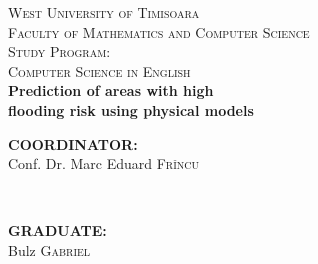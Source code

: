 \documentclass[12pt, a4paper]{report}
\begin{document}
\begin{titlepage}

\newcommand{\HRule}{\rule{\linewidth}{0.5mm}} %

\center %


\vspace{3cm}


\textsc{\LARGE West University of  Timisoara}\\[0.5cm] %
\textsc{\Large Faculty of Mathematics and Computer Science}\\[0.5cm] %
\textsc{\large Study Program: \\Computer Science in English}\\[6cm] %




{\Huge \bfseries Prediction of areas with high  }
\\[0.4cm]
{\Huge \bf flooding risk using physical models}\\[5cm] %
 


\begin{minipage}{0.4\textwidth}
\begin{flushleft} \large
\textbf{COORDINATOR:}\\
Conf. Dr. Marc Eduard \textsc{Fr\^incu} %
\end{flushleft}
\end{minipage}
~
\begin{minipage}{0.4\textwidth}
\begin{flushright} \large
\textbf{GRADUATE:} \\
Bulz \textsc{Gabriel} %
\end{flushright}
\end{minipage}\\[1cm]


\end{titlepage}
\end{document}
